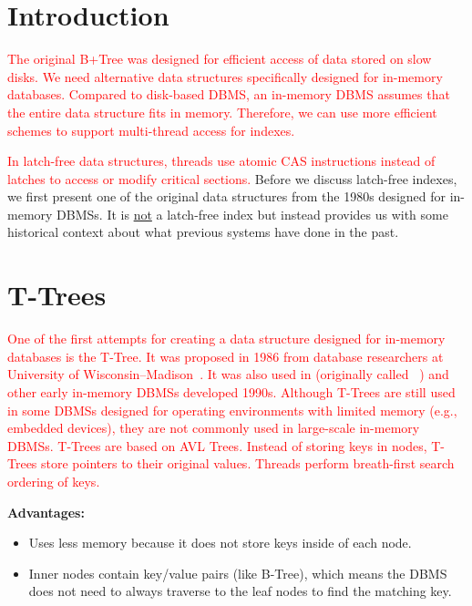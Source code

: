 \documentclass[11pt]{article}
\newcommand{\rr}[1]{\textcolor{red}{#1}}
\begin{document}
\maketitle
\thispagestyle{plain}

\section{Introduction}
\rr{The original B+Tree was designed for efficient access of data stored on slow disks. We need alternative data structures specifically designed for in-memory databases. Compared to disk-based DBMS, an in-memory DBMS assumes that the entire data structure fits in memory. Therefore, we can use more efficient schemes to support multi-thread access for indexes.}

\rr{In latch-free data structures, threads use atomic CAS instructions instead of latches to access or modify critical sections.} Before we discuss latch-free indexes, we first present one of the original data structures from the 1980s designed for in-memory DBMSs. It is \underline{not} a latch-free index but instead provides us with some historical context about what previous systems have done in the past.


\section{T-Trees}
\rr{One of the first attempts for creating a data structure designed for in-memory databases is the T-Tree. It was proposed in 1986 from database researchers at University of Wisconsin--Madison~\cite{P294}.
It was also used in \dbSys{TimesTen} (originally called \dbSys{Smallbase}~\cite{heytens95}) and other early in-memory DBMSs developed 1990s. Although T-Trees are still used in some DBMSs designed for operating environments with limited memory (e.g., embedded devices), they are not commonly used in large-scale in-memory DBMSs. T-Trees are based on AVL Trees.
Instead of storing keys in nodes, T-Trees store pointers to their original 
values. Threads perform breath-first search ordering of keys.}



\textbf{Advantages:}
\begin{itemize}
    \item
    Uses less memory because it does not store keys inside of each node.
    
    \item
    Inner nodes contain key/value pairs (like B-Tree), which means the DBMS does not need to always traverse to the leaf nodes to find the matching key.
\end{itemize}
\end{document}
